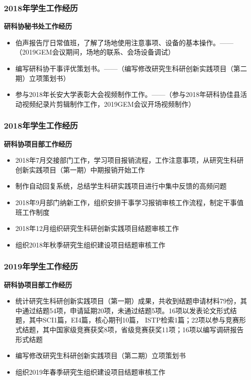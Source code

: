 \documentclass[10pt,aspectratio=43,mathserif]{beamer}
\begin{document}
	\begin{frame}
		\frametitle{\textbf{2018年学生工作经历}}
		\begin{block}{\textbf{研科协秘书处工作经历}}
			\begin{itemize}
				\item 伯声报告厅日常值班，了解了场地使用注意事项、设备的基本操作。------（2019GEM会议期间，场地的联系、会场设备调试）
				\item 编写研科协干事评优策划书。------（编写修改研究生科研创新实践项目（第二期）立项策划书）
				\item 参与2018年长安大学表彰大会视频制作工作。------（参与2018年研科协佳县活动视频纪录片剪辑制作工作，2019GEM会议开场视频制作）
			\end{itemize}
		\end{block}
	\end{frame}

	\begin{frame}
		\frametitle{\textbf{2018年学生工作经历}}
		\begin{block}{\textbf{研科协项目部工作经历}}
			\begin{itemize}
				\item 2018年7月交接部门工作，学习项目报销流程，工作注意事项，从研究生科研创新实践项目（第一期）中期报销开始工作
				\item 制作自动回复系统，总结学生科研实践项目进行中集中反馈的高频问题
				\item 2018年9月部门纳新工作，组织安排干事学习报销审核工作流程，制定干事值班工作制度
				\item 2018年12月组织研究生科研创新实践项目结题审核工作
				\item 组织2018年秋季研究生组织建设项目结题审核工作
			\end{itemize}
		\end{block}
	\end{frame}

	\begin{frame}
		\frametitle{\textbf{2019年学生工作经历}}
		\begin{block}{\textbf{研科协项目部工作经历}}
			\begin{itemize}
				\item 统计研究生科研创新实践项目（第一期）成果，共收到结题申请材料79份，其中通过结题54项，申请延期20项，未通过结题5项。16项以发表论文形式结题，其中SCI1篇，EI4篇，核心期刊10篇，
				ISTP检索1篇；22项以参与竞赛形式结题，其中国家级竞赛获奖8项，省级竞赛获奖11项；16项以编写调研报告形式结题
				\item 编写修改研究生科研创新实践项目（第二期）立项策划书
				\item 组织2019年春季研究生组织建设项目结题审核工作
			\end{itemize}
		\end{block}
	\end{frame}
\end{document}
